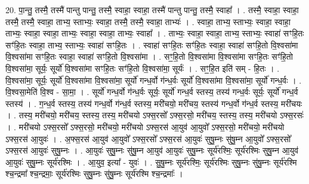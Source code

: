 \documentclass[17pt]{extarticle}
\begin{document}
20. पा॒न्तु॒ तस्मै॒ तस्मै॑ पान्तु पान्तु॒ तस्मै॒ स्वाहा॒ स्वाहा॒ तस्मै॑ पान्तु पान्तु॒ तस्मै॒ स्वाहा᳚ । . तस्मै॒ स्वाहा॒ स्वाहा॒ तस्मै॒ तस्मै॒ स्वाहा॒ ताभ्य॒ स्ताभ्यः॒ स्वाहा॒ तस्मै॒ तस्मै॒ स्वाहा॒ ताभ्यः॑ । . स्वाहा॒ ताभ्य॒ स्ताभ्यः॒ स्वाहा॒ स्वाहा॒ ताभ्यः॒ स्वाहा॒ स्वाहा॒ ताभ्यः॒ स्वाहा॒ स्वाहा॒ ताभ्यः॒ स्वाहा᳚ । . ताभ्यः॒ स्वाहा॒ स्वाहा॒ ताभ्य॒ स्ताभ्यः॒ स्वाहा॑ सꣳहि॒तः सꣳ॑हि॒तः स्वाहा॒ ताभ्य॒ स्ताभ्यः॒ स्वाहा॑ 
सꣳहि॒तः । . स्वाहा॑ सꣳहि॒तः सꣳ॑हि॒तः स्वाहा॒ स्वाहा॑ सꣳहि॒तो वि॒श्वसा॑मा वि॒श्वसा॑मा सꣳहि॒तः स्वाहा॒ स्वाहा॑ 
सꣳहि॒तो वि॒श्वसा॑मा । . सꣳ॒॒हि॒तो वि॒श्वसा॑मा वि॒श्वसा॑मा सꣳहि॒तः सꣳ॑हि॒तो वि॒श्वसा॑मा॒ सूर्यः॒ सूर्यो॑ वि॒श्वसा॑मा सꣳहि॒तः सꣳ॑हि॒तो वि॒श्वसा॑मा॒ सूर्यः॑ । . सꣳ॒॒हि॒त इति॑ सम् - हि॒तः । . वि॒श्वसा॑मा॒ सूर्यः॒ सूर्यो॑ वि॒श्वसा॑मा वि॒श्वसा॑मा॒ सूर्यो॑ गन्ध॒र्वो ग॑न्ध॒र्वः सूर्यो॑ वि॒श्वसा॑मा वि॒श्वसा॑मा॒ सूर्यो॑ गन्ध॒र्वः । . वि॒श्वसा॒मेति॑ वि॒श्व - सा॒मा॒ । . सूर्यो॑ गन्ध॒र्वो ग॑न्ध॒र्वः सूर्यः॒ सूर्यो॑ गन्ध॒र्व स्तस्य॒ तस्य॑ गन्ध॒र्वः सूर्यः॒ सूर्यो॑ गन्ध॒र्व स्तस्य॑ । . ग॒न्ध॒र्व स्तस्य॒ तस्य॑ गन्ध॒र्वो ग॑न्ध॒र्व स्तस्य॒ मरी॑चयो॒ मरी॑चय॒ स्तस्य॑ गन्ध॒र्वो ग॑न्ध॒र्व स्तस्य॒ मरी॑चयः । . तस्य॒ मरी॑चयो॒ मरी॑चय॒ स्तस्य॒ तस्य॒ मरी॑चयो ऽफ्स॒रसो᳚ ऽफ्स॒रसो॒ मरी॑चय॒ स्तस्य॒ तस्य॒ मरी॑चयो ऽफ्स॒रसः॑ । . मरी॑चयो ऽफ्स॒रसो᳚ ऽफ्स॒रसो॒ मरी॑चयो॒ मरी॑चयो ऽफ्स॒रस॑ आ॒युव॑ आ॒युवो᳚ ऽफ्स॒रसो॒ मरी॑चयो॒ मरी॑चयो ऽफ्स॒रस॑ आ॒युवः॑ । . अ॒फ्स॒रस॑ आ॒युव॑ आ॒युवो᳚ ऽफ्स॒रसो᳚ ऽफ्स॒रस॑ आ॒युवः॑ सुषु॒म्नः सु॑षु॒म्न आ॒युवो᳚ ऽफ्स॒रसो᳚ ऽफ्स॒रस॑ आ॒युवः॑ सुषु॒म्नः । . आ॒युवः॑ सुषु॒म्नः सु॑षु॒म्न आ॒युव॑ आ॒युवः॑ सुषु॒म्नः सूर्य॑रश्मिः॒ सूर्य॑रश्मिः सुषु॒म्न आ॒युव॑ आ॒युवः॑ सुषु॒म्नः सूर्य॑रश्मिः । . आ॒युव॒ इत्या᳚ - युवः॑ । . सु॒षु॒म्नः सूर्य॑रश्मिः॒ सूर्य॑रश्मिः सुषु॒म्नः सु॑षु॒म्नः सूर्य॑रश्मि श्च॒न्द्रमा᳚ श्च॒न्द्रमाः॒ सूर्य॑रश्मिः सुषु॒म्नः सु॑षु॒म्नः सूर्य॑रश्मि श्च॒न्द्रमाः᳚ । \newline
\end{document}
